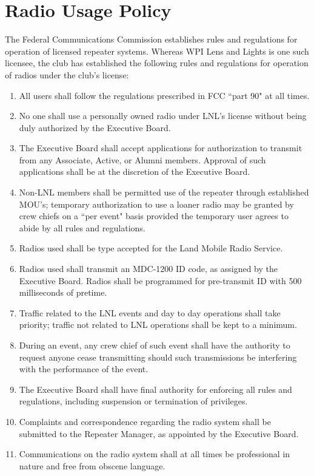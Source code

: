 \documentclass[12pt,letterpaper,oneside]{book}
\begin{document}
\chapter{Radio Usage Policy}

The Federal Communications Commission establishes rules and regulations for operation of licensed repeater systems. Whereas WPI Lens and Lights is one such licensee, the club has established the following rules and regulations for operation of radios under the club's license:

\begin{enumerate}

\item All users shall follow the regulations prescribed in FCC ``part 90" at all times.
\item No one shall use a personally owned radio under LNL's license without being duly authorized by the Executive Board.
\item The Executive Board shall accept applications for authorization to transmit from any Associate, Active, or Alumni members. Approval of such applications shall be at the discretion of the Executive Board.
\item Non-LNL members shall be permitted use of the repeater through established MOU's; temporary authorization to use a loaner radio may be granted by crew chiefs on a ``per event" basis provided the temporary user agrees to abide by all rules and regulations.
\item Radios used shall be type accepted for the Land Mobile Radio Service.
\item Radios used shall transmit an MDC-1200 ID code, as assigned by the Executive Board. Radios shall be programmed for pre-transmit ID with 500 milliseconds of pretime.
\item Traffic related to the LNL events and day to day operations shall take priority; traffic not related to LNL operations shall be kept to a minimum.
\item During an event, any crew chief of such event shall have the authority to request anyone cease transmitting should such transmissions be interfering with the performance of the event.
\item The Executive Board shall have final authority for enforcing all rules and regulations, including suspension or termination of privileges.
\item Complaints and correspondence regarding the radio system shall be submitted to the Repeater Manager, as appointed by the Executive Board.
\item Communications on the radio system shall at all times be professional in nature and free from obscene language.

\end{enumerate}
\end{document}
